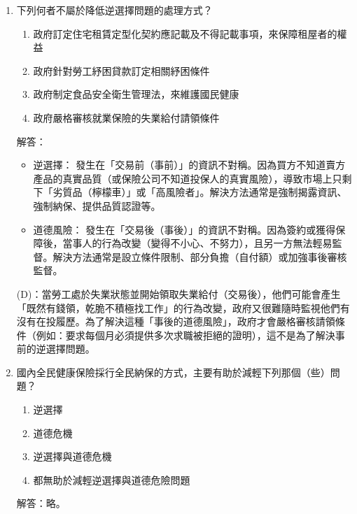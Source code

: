 \documentclass[12pt, a4paper]{article}
\begin{document}
\begin{enumerate}
    \item 下列何者不屬於降低逆選擇問題的處理方式？
    \begin{enumerate}[label=\Alph*.]
        \item 政府訂定住宅租賃定型化契約應記載及不得記載事項，來保障租屋者的權益
        \item 政府針對勞工紓困貸款訂定相關紓困條件
        \item 政府制定食品安全衛生管理法，來維護國民健康
        \item 政府嚴格審核就業保險的失業給付請領條件
    \end{enumerate}
    解答：
    \begin{itemize}
        \item 逆選擇： 發生在「交易前（事前）」的資訊不對稱。因為買方不知道賣方產品的真實品質（或保險公司不知道投保人的真實風險），導致市場上只剩下「劣質品（檸檬車）」或「高風險者」。解決方法通常是強制揭露資訊、強制納保、提供品質認證等。
        \item 道德風險： 發生在「交易後（事後）」的資訊不對稱。因為簽約或獲得保障後，當事人的行為改變（變得不小心、不努力），且另一方無法輕易監督。解決方法通常是設立條件限制、部分負擔（自付額）或加強事後審核監督。
    \end{itemize}
     (D)：當勞工處於失業狀態並開始領取失業給付（交易後），他們可能會產生「既然有錢領，乾脆不積極找工作」的行為改變，政府又很難隨時監視他們有沒有在投履歷。為了解決這種「事後的道德風險」，政府才會嚴格審核請領條件（例如：要求每個月必須提供多次求職被拒絕的證明），這不是為了解決事前的逆選擇問題。

    \item 國內全民健康保險採行全民納保的方式，主要有助於減輕下列那個（些）問題？
    \begin{enumerate}[label=\Alph*.]
        \item 逆選擇
        \item 道德危機
        \item 逆選擇與道德危機
        \item 都無助於減輕逆選擇與道德危險問題
    \end{enumerate}
    解答：略。


\end{enumerate}
\end{document}
